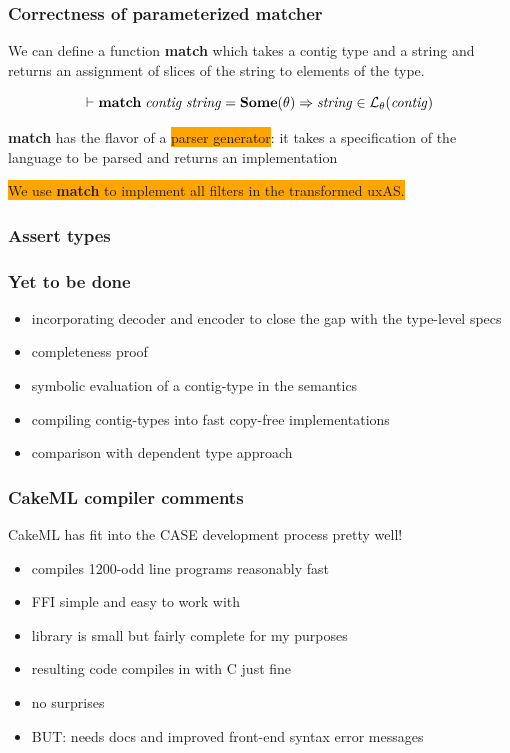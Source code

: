 \documentclass{beamer}
\newcommand{\imp}{\Rightarrow}
\newcommand{\kemph}[1]{\colorbox{orange}{#1}}
\newcommand{\konst}[1]{\ensuremath{\mbox{\bf{#1}}}}
\newcommand{\LangTheta}[1]{\ensuremath{{\mathcal L}_{\theta}({#1})}}
\begin{document}
\begin{frame}[fragile]\frametitle{Correctness of parameterized matcher}

We can define a function \textbf{match} which takes a contig type and
a string and returns an assignment of slices of the string to elements of the type.

\begin{theorem}[Soundness]
  \[
 \vdash \konst{match}\; \mathit{contig}\; \mathit{string} = \konst{Some}(\theta) \imp
   \mathit{string} \in \LangTheta{\mathit{contig}}
\]
\end{theorem}

\textbf{match} has the flavor of a \kemph{parser generator}: it takes a
specification of the language to be parsed and returns an implementation

\colorbox{orange}{We use \textbf{match} to implement all filters in
  the transformed uxAS.}

\end{frame}

\begin{frame}[fragile]\frametitle{Assert types}
\end{frame}

\begin{frame}\frametitle{Yet to be done}

\begin{itemize}
\item incorporating decoder and encoder to close the gap with the type-level specs
\item completeness proof
\item symbolic evaluation of a contig-type in the semantics
\item compiling contig-types into fast copy-free implementations
\item comparison with dependent type approach
\end{itemize}
\end{frame}


\begin{frame}\frametitle{CakeML compiler comments}

CakeML has fit into the CASE development process pretty well!

\begin{itemize}
\item compiles 1200-odd line programs reasonably fast
\item FFI simple and easy to work with
\item library is small but fairly complete for my purposes
\item resulting code compiles in with C just fine
\item no surprises
\item BUT: needs docs and improved front-end syntax error messages
\end{itemize}
\end{frame}
\end{document}
